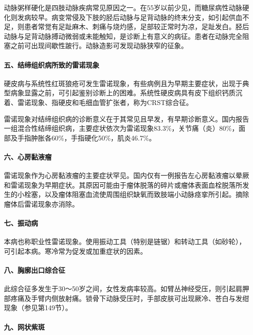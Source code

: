 动脉粥样硬化是四肢动脉疾病常见原因之一。在55岁以前少见，而糖尿病性动脉硬化则发病较早。病变常侵及下肢的胫后动脉与足背动脉的终末分支，如引起供血不足，则患者常觉有足趾麻木、刺痛与烧灼感，足部较正常时为凉，足趾发白。胫后动脉与足背动脉搏动微弱或未能触知，是诊断上有意义的病征。患者在动脉完全阻塞之前可出现间歇性跛行。动脉造影可发现动脉狭窄的征象。

\paragraph{五、结缔组织病所致的雷诺现象}

硬皮病与系统性红斑狼疮可发生雷诺现象，有些病例且为早期主要症状，出现于典型病象显露之前，可引起鉴别诊断上的困难。系统性硬皮病具有皮下组织钙质沉着、雷诺现象、指硬皮和毛细血管扩张者，称为CRST综合征。

雷诺现象对结缔组织病的诊断意义在于其常见且早发，有早期诊断意义。国内报告一组混合性结缔组织病，主要症状依次为雷诺现象83.3\%，关节痛（炎）80\%，面部及手指肿胀各60\%，手指硬化50\%，肌炎46.7\%。

\paragraph{六、心房黏液瘤}

雷诺现象作为心房黏液瘤的主要症状罕见。国内仅有一例报告左心房黏液瘤以晕厥和雷诺现象为早期症状。其原因可能由于瘤体脱落的碎片或瘤体表面血栓脱落所发生的小栓塞，以及瘤体阻塞血流使周围组织缺氧而致肢端小动脉痉挛所引起。摘除瘤体后雷诺现象亦消除。

\paragraph{七、振动病}

本病也称职业性雷诺现象。使用振动工具（特别是链锯）和转动工具（如砂轮），可引起本病。寒冷常为促发或加重症状的因素。

\paragraph{八、胸廓出口综合征}

此综合征多发生于30～50岁之间，女性发病率较高。如臂丛神经受压，则引起肩胛部疼痛及手臂内侧放射痛。锁骨下动脉受压时，手部皮肤可出现厥冷、苍白与发绀现象（参见第149节）。

\paragraph{九、网状紫斑}

